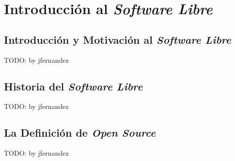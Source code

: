 \chapter{Introducción al \textit{Software Libre}}
\section{Introducción y Motivación al \textit{Software Libre}}

TODO: by jfernandez

\section{Historia del \textit{Software Libre}}

TODO: by jfernandez

\section{La Definición de \textit{Open Source}}

TODO: by jfernandez